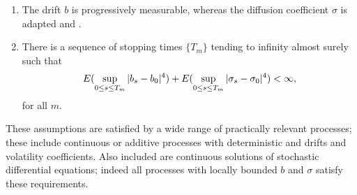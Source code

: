 \begin{ass}\label{as:vol}\mbox{} 
  \begin{enumerate}
    \item The drift $b$ is progressively measurable, whereas the diffusion coefficient $\sigma$  is adapted and \cadlag.
    \item There is a sequence of stopping times $\{T_m\}$ tending to infinity almost surely such that   
      \begin{align}
       E( \sup_{0 \le  s \le T_m} \vert b_s  - b_0\vert^4) + E( \sup_{0 \le  s \le T_m} \vert \sigma_s  - \sigma_0\vert^4)< \infty,\notag
        \label{}
      \end{align}
      for all $m$. 
  \end{enumerate}
\end{ass}
\begin{remark}
  These assumptions are satisfied by a wide range of practically relevant processes; these  include  continuous \levy or additive  processes with deterministic and \cadlag drifts  and volatility coefficients. Also included are  continuous solutions of stochastic differential equations; indeed  all processes with locally bounded $b$ and $\sigma$ satisfy these requirements. 
\end{remark}
